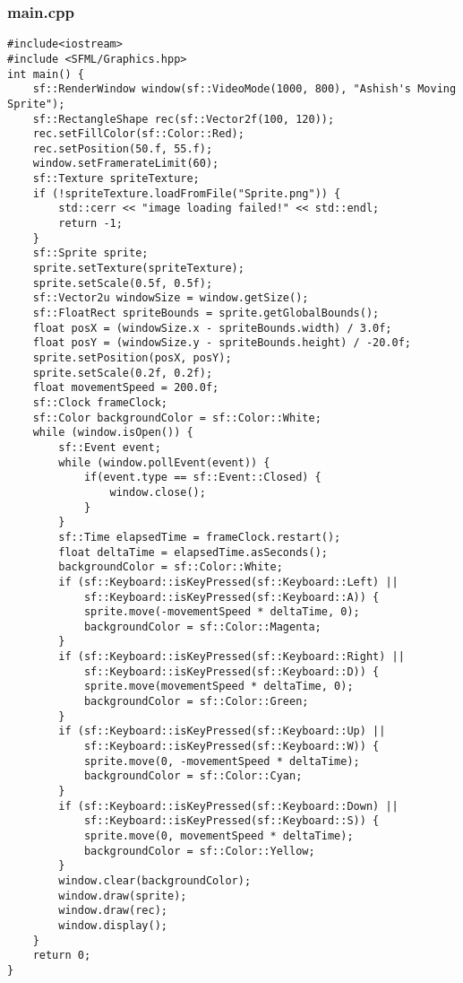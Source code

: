 \documentclass[12pt]{article}
\begin{document}
\subsubsection{main.cpp}
\begin{lstlisting}[style=cppcode]
#include<iostream>
#include <SFML/Graphics.hpp>
int main() {
    sf::RenderWindow window(sf::VideoMode(1000, 800), "Ashish's Moving Sprite");
    sf::RectangleShape rec(sf::Vector2f(100, 120));
    rec.setFillColor(sf::Color::Red);
    rec.setPosition(50.f, 55.f);
    window.setFramerateLimit(60);
    sf::Texture spriteTexture;
    if (!spriteTexture.loadFromFile("Sprite.png")) {
        std::cerr << "image loading failed!" << std::endl;
        return -1;
    }
    sf::Sprite sprite;
    sprite.setTexture(spriteTexture);
    sprite.setScale(0.5f, 0.5f);
    sf::Vector2u windowSize = window.getSize();
    sf::FloatRect spriteBounds = sprite.getGlobalBounds();
    float posX = (windowSize.x - spriteBounds.width) / 3.0f;
    float posY = (windowSize.y - spriteBounds.height) / -20.0f;
    sprite.setPosition(posX, posY);
    sprite.setScale(0.2f, 0.2f);
    float movementSpeed = 200.0f;
    sf::Clock frameClock;
    sf::Color backgroundColor = sf::Color::White;
    while (window.isOpen()) {
        sf::Event event;
        while (window.pollEvent(event)) {
            if(event.type == sf::Event::Closed) {
                window.close();
            }
        }
        sf::Time elapsedTime = frameClock.restart();
        float deltaTime = elapsedTime.asSeconds();
        backgroundColor = sf::Color::White;
        if (sf::Keyboard::isKeyPressed(sf::Keyboard::Left) ||
            sf::Keyboard::isKeyPressed(sf::Keyboard::A)) {
            sprite.move(-movementSpeed * deltaTime, 0);
            backgroundColor = sf::Color::Magenta;
        }
        if (sf::Keyboard::isKeyPressed(sf::Keyboard::Right) ||
            sf::Keyboard::isKeyPressed(sf::Keyboard::D)) {
            sprite.move(movementSpeed * deltaTime, 0);
            backgroundColor = sf::Color::Green;
        }
        if (sf::Keyboard::isKeyPressed(sf::Keyboard::Up) ||
            sf::Keyboard::isKeyPressed(sf::Keyboard::W)) {
            sprite.move(0, -movementSpeed * deltaTime);
            backgroundColor = sf::Color::Cyan;
        }
        if (sf::Keyboard::isKeyPressed(sf::Keyboard::Down) ||
            sf::Keyboard::isKeyPressed(sf::Keyboard::S)) {
            sprite.move(0, movementSpeed * deltaTime);
            backgroundColor = sf::Color::Yellow;
        }
        window.clear(backgroundColor);
        window.draw(sprite);
        window.draw(rec);
        window.display();
    }
    return 0;
}
\end{lstlisting}
\end{document}
